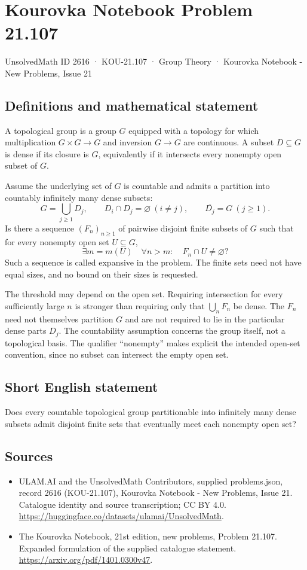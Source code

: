 \documentclass[11pt,a4paper]{article}
\begin{document}
\section*{Kourovka Notebook Problem 21.107}\label{2616}
{\small UnsolvedMath ID 2616 · KOU-21.107 · Group Theory · Kourovka Notebook - New Problems, Issue 21}
\subsection{Definitions and mathematical statement}
A topological group is a group $G$ equipped with a topology for which multiplication $G\times G\to G$ and inversion $G\to G$ are continuous. A subset $D\subseteq G$ is dense if its closure is $G$, equivalently if it intersects every nonempty open subset of $G$.

Assume the underlying set of $G$ is countable and admits a partition into countably infinitely many dense subsets:
\[
 G=\bigcup_{j\ge1}D_j,\qquad D_i\cap D_j=\varnothing\ (i\ne j),
 \qquad\overline{D_j}=G\ (j\ge1).
\]
Is there a sequence $(F_n)_{n\ge1}$ of pairwise disjoint finite subsets of $G$ such that for every nonempty open set $U\subseteq G$,
\[
 \exists m=m(U)\quad\forall n>m:\quad F_n\cap U\ne\varnothing?
\]
Such a sequence is called expansive in the problem. The finite sets need not have equal sizes, and no bound on their sizes is requested.

The threshold may depend on the open set. Requiring intersection for every sufficiently large $n$ is stronger than requiring only that $\bigcup_nF_n$ be dense. The $F_n$ need not themselves partition $G$ and are not required to lie in the particular dense parts $D_j$. The countability assumption concerns the group itself, not a topological basis. The qualifier ``nonempty'' makes explicit the intended open-set convention, since no subset can intersect the empty open set.
\subsection{Short English statement}
Does every countable topological group partitionable into infinitely many dense subsets admit disjoint finite sets that eventually meet each nonempty open set?
\subsection{Sources}
\begin{itemize}
\item[S1] ULAM.AI and the UnsolvedMath Contributors, supplied problems.json, record 2616 (KOU-21.107), Kourovka Notebook - New Problems, Issue 21. Catalogue identity and source transcription; CC BY 4.0.
\url{https://huggingface.co/datasets/ulamai/UnsolvedMath}.
\item[S2] The Kourovka Notebook, 21st edition, new problems, Problem 21.107. Expanded formulation of the supplied catalogue statement.
\url{https://arxiv.org/pdf/1401.0300v47}.
\end{itemize}
\end{document}

